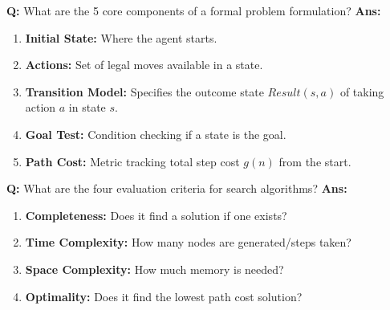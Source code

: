 \documentclass[10pt,a4paper,twocolumn]{article}
\begin{document}
\begin{tcolorbox}[
  colback=white,
  colframe=UnitColorThree,
  colbacktitle=gray!10!white,
  coltitle=black,
  fonttitle=\bfseries\sffamily\small,
  title={Unit III $\bullet$ Card 1: Components of Problem Formulation},
  boxrule=1.2pt,
  arc=2mm,
  outer arc=2mm,
  boxsep=1.5mm,
  top=1mm,
  bottom=1mm,
  left=1.5mm,
  right=1.5mm,
  before skip=2.5mm,
  after skip=2.5mm
]
\textbf{Q:} What are the 5 core components of a formal problem formulation?
\tcbline
\textbf{Ans:} \begin{enumerate}
  \item \textbf{Initial State:} Where the agent starts.
  \item \textbf{Actions:} Set of legal moves available in a state.
  \item \textbf{Transition Model:} Specifies the outcome state $Result(s, a)$ of taking action $a$ in state $s$.
  \item \textbf{Goal Test:} Condition checking if a state is the goal.
  \item \textbf{Path Cost:} Metric tracking total step cost $g(n)$ from the start.
\end{enumerate}
\end{tcolorbox}


\begin{tcolorbox}[
  colback=white,
  colframe=UnitColorThree,
  colbacktitle=gray!10!white,
  coltitle=black,
  fonttitle=\bfseries\sffamily\small,
  title={Unit III $\bullet$ Card 2: Evaluation Criteria},
  boxrule=1.2pt,
  arc=2mm,
  outer arc=2mm,
  boxsep=1.5mm,
  top=1mm,
  bottom=1mm,
  left=1.5mm,
  right=1.5mm,
  before skip=2.5mm,
  after skip=2.5mm
]
\textbf{Q:} What are the four evaluation criteria for search algorithms?
\tcbline
\textbf{Ans:} \begin{enumerate}
  \item \textbf{Completeness:} Does it find a solution if one exists?
  \item \textbf{Time Complexity:} How many nodes are generated/steps taken?
  \item \textbf{Space Complexity:} How much memory is needed?
  \item \textbf{Optimality:} Does it find the lowest path cost solution?
\end{enumerate}
\end{tcolorbox}
\end{document}
